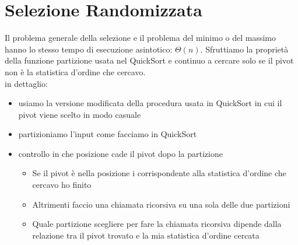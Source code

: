 \section{Selezione Randomizzata}
Il problema generale della selezione e il problema del minimo o del massimo hanno lo stesso tempo di esecuzione asintotico: $\Theta(n)$.
Sfruttiamo la proprietà della funzione partizione usata nel QuickSort e continuo a cercare solo se il pivot non è la statistica d'ordine che cercavo.\\
in dettaglio:\\
\begin{itemize}
    \item usiamo la versione modificata della procedura usata in QuickSort in cui il pivot viene scelto in modo casuale
    \item partizioniamo l'input come facciamo in QuickSort
    \item controllo in che posizione cade il pivot dopo la partizione
    \begin{itemize}[label=--]
        \item Se il pivot è nella posizione i corrispondente alla statistica d'ordine che cercavo ho finito
        \item Altrimenti faccio una chiamata ricorsiva su una sola delle due partizioni 
        \item Quale partizione scegliere per fare la chiamata ricorsiva dipende dalla relazione tra il pivot trovato e la mia statistica d'ordine cercata
    \end{itemize}
\end{itemize}
\noindent 
